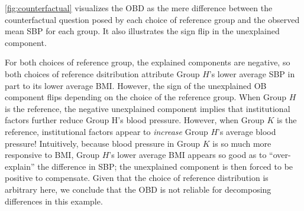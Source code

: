 \cref{fig:counterfactual} visualizes the OBD as the mere difference between the counterfactual question posed by each choice of reference group and the observed mean SBP for each group. It also illustrates the sign flip in the unexplained component.

For both choices of reference group, the explained components are negative, so both choices of reference dsitribution attribute Group $H$'s lower average SBP in part to its lower average BMI.
However, the sign of the unexplained OB component flips depending on the choice of the reference group.
When Group $H$ is the reference, the negative unexplained component implies that institutional factors further reduce Group H's blood pressure.
However, when Group $K$ is the reference, institutional factors appear to \emph{increase} Group $H$'s average blood pressure!
Intuitively, because blood pressure in Group $K$ is so much more responsive to BMI, Group $H$'s lower average BMI appears so good as to ``over-explain'' the difference in SBP; the unexplained component is then forced to be positive to compensate.
Given that the choice of reference distribution is arbitrary here, we conclude that the OBD is not reliable for decomposing differences in this example.

